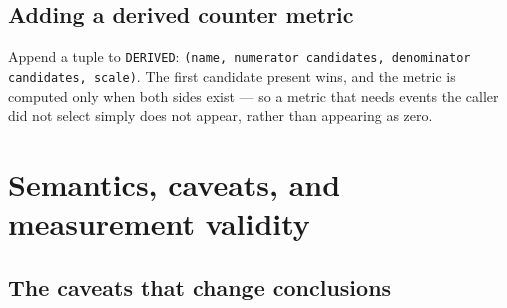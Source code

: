 \documentclass[11pt,a4paper]{article}
\newcommand{\code}[1]{\texttt{\let\_\breakableunderscore #1}}
\newcommand{\breakableunderscore}{\textunderscore\allowbreak}
\begin{document}
\subsection{Adding a derived counter metric}

Append a tuple to \code{\_DERIVED}: \code{(name, numerator candidates,
denominator candidates, scale)}. The first candidate present wins, and the
metric is computed only when both sides exist --- so a metric that needs events
the caller did not select simply does not appear, rather than appearing as
zero.

\section{Semantics, caveats, and measurement validity}
\label{sec:caveats}

\subsection{The caveats that change conclusions}
\end{document}
